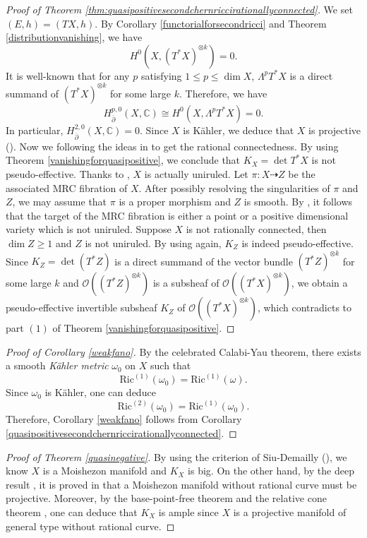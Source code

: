 \documentclass[11pt]{amsart}
\newcommand\sO{{\mathscr O}}
\newcommand\bp{{\bar\partial}}
\theoremstyle{plain}
\theoremstyle{definition}
\newcommand{\bproof}{\begin{proof}}
\newcommand{\eproof}{\end{proof}}
\renewcommand{\bar}{\overline}
\newcommand{\beq}{\begin{equation}}
\newcommand{\eeq}{\end{equation}}
\renewcommand{\bp}{\bar{\partial}}
\newcommand{\ts}{\otimes}
\renewcommand{\>}{\rightarrow}
\newcommand{\C}{{\mathbb C}}
\numberwithin{equation}{section} %
\begin{document}
	\bproof[{Proof of Theorem \ref{thm:quasipositivesecondchernriccirationallyconnected}}]  We set $(E,h)=(TX,h)$.  By Corollary \ref{functorialforsecondricci} and Theorem \ref{distributionvanishing}, we have
	$$H^0(X,(T^*X)^{\ts k})=0.$$
	It is well-known that for any $p$ satisfying $1\leq p\leq \dim X$, $\Lambda^pT^*X$ is a direct summand of $(T^*X)^{\ts k}$ for some large $k$. Therefore, we have
	$$H_{\bp}^{p,0}(X,\C)\cong H^{0}(X,\Lambda^p T^*X)=0.$$
	In particular,  $H_{\bp}^{2,0}(X,\C)=0$. Since $X$ is K\"ahler, we deduce that $X$ is projective (\cite{Kodaira1954}).
	Now we following the ideas in \cite{Graber2003,Peternell2006,Campana2015a} to get the rational connectedness.
	By using Theorem \ref{vanishingforquasipositive}, we conclude that $K_X=\det T^*X$ is not pseudo-effective.
	Thanks to \cite{BoucksomDemaillyPuaunPeternell2013}, $X$ is actually uniruled.  Let $\pi:X\dashrightarrow Z$ be the
	associated MRC fibration of $X$. After possibly resolving the
	singularities of $\pi$ and $Z$, we may assume that $\pi$ is a proper
	morphism and $Z$ is smooth. By \cite[Corollary~1.4]{Graber2003}, it
	follows that the target of the MRC fibration is either a point or a
	positive dimensional variety which is not uniruled. Suppose $X$ is
	not rationally connected, then $\dim Z\geq 1$ and $Z$ is not
	uniruled. By using \cite{BoucksomDemaillyPuaunPeternell2013} again, $K_Z$ is indeed pseudo-effective.
	Since $K_Z=\det(T^*Z)$ is  a direct summand of the vector bundle $(T^*Z)^{\ts k}$ for some large $k$ and $\sO((T^*Z)^{\ts k})$ is a subsheaf of $ \sO\left((T^*X)^{\ts k}\right)$,  we obtain a pseudo-effective invertible subsheaf $K_Z$ of $\sO((T^*X)^{\ts k})$, which contradicts to part $(1)$ of Theorem \ref{vanishingforquasipositive}.
	\eproof
	


\bproof[Proof of Corollary \ref{weakfano}] By the celebrated Calabi-Yau theorem, there exists a smooth \emph{K\"ahler metric} $\omega_0$ on $X$ such that 
\beq \mathrm{Ric}^{(1)}(\omega_0)=\mathrm{Ric}^{(1)}(\omega).\eeq
Since $\omega_0$ is K\"ahler, one can deduce
$$\mathrm{Ric}^{(2)}(\omega_0)=\mathrm{Ric}^{(1)}(\omega_0).$$
Therefore, Corollary \ref{weakfano} follows from Corollary \ref{quasipositivesecondchernriccirationallyconnected}.
\eproof
	
	\bproof[Proof of Theorem \ref{quasinegative}] By using the criterion of Siu-Demailly (\cite{Siu1984,Demailly1985}), we know $X$ is a Moishezon manifold and $K_X$ is  big. On the other hand, by the deep result  \cite[Corollary~1.4.6]{Birkar2010}, it is proved in \cite[Theorem~3.1]{Cascini2013} that a Moishezon manifold without rational curve must be projective. Moreover, by the base-point-free theorem and the relative cone theorem \cite{Mori1982,Kawamata1985,KollarMiyaokaMori1992}, one can deduce that $K_X$ is ample since $X$ is a projective manifold of general type  without rational curve.
	\eproof
	


\baselineskip

	
	\def\cprime{$'$} %
	


	\renewcommand\refname{Reference}
	
	
	
\end{document}
